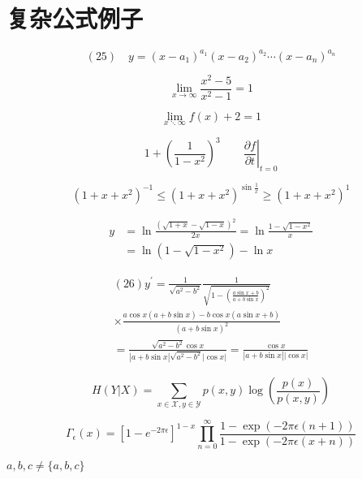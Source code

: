 \documentclass{article}
\begin{document}
\section{复杂公式例子}
    \[
    (25)\quad y=\left(x-a_{1}\right)^{a_{1}}\left(x-a_{2}\right)^{a_{2}} \cdots\left(x-a_{n}\right)^{a_{n}}
    \]

    \[
    \lim _{x \rightarrow \infty} \frac{x^{2}-5}{x^{2}-1}=1
    \]

    $$\lim _{x \ddots \infty} {f(x)+ 2} = 1$$

    \[1 + \left(\frac{1}{1-x^{2}}
    \right)^3 \qquad
    \left.\frac{\partial f}{\partial t}
    \right|_{t=0}\]

    \[(1 + x + x^2)^{-1} \leqslant (1 + x + x^2)^{\sin\frac{1}{x}} \geqslant (1+x+x^2)^{1}\] %

    \[
    \begin{aligned} y &=\ln \frac{(\sqrt{1+x}-\sqrt{1-x})^{2}}{2 x}=\ln \frac{1-\sqrt{1-x^{2}}}{x} \\ &=\ln (1-\sqrt{1-x^{2}})-\ln x \end{aligned}
    \]


    \[
    \begin{array}{l}{(26) y^{\prime}=\frac{1}{\sqrt{a^{2}-b^{2}}} \frac{1}{\sqrt{1-\left(\frac{a \sin x+b}{a+b \sin x}\right)^{2}}}} \\ {\times \frac{a \cos x(a+b \sin x)-b \cos x(a \sin x+b)}{(a+b \sin x)^{2}}} \\ {=\frac{\sqrt{a^{2}-b^{2}} \cos x}{|a+b \sin x| \sqrt{a^{2}-b^{2}}|\cos x|}=\frac{\cos x}{|a+b \sin x||\cos x|}}\end{array}
    \]

    \[
    H(Y | X)=\sum_{x \in \mathcal{X}, y \in \mathcal{Y}} p(x, y) \log \left(\frac{p(x)}{p(x, y)}\right)
    \]

    \[
    \Gamma_{\epsilon}(x)=\left[1-e^{-2 \pi \epsilon}\right]^{1-x} \prod_{n=0}^{\infty} \frac{1-\exp (-2 \pi \epsilon(n+1))}{1-\exp (-2 \pi \epsilon(x+n))}
    \]

    ${a,b,c}\neq \{a,b,c\}$
\end{document}
